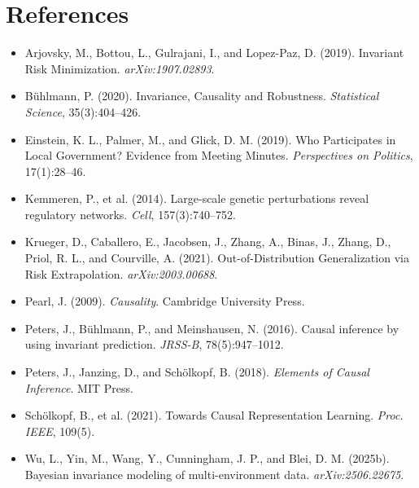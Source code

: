 \documentclass[11pt]{article}
\begin{document}
\section*{References}
\scriptsize
\setlength{\parskip}{0pt}
\begin{itemize}
    \setlength\itemsep{0em}
    \item Arjovsky, M., Bottou, L., Gulrajani, I., and Lopez-Paz, D. (2019). Invariant Risk Minimization. \textit{arXiv:1907.02893}.
    \item Bühlmann, P. (2020). Invariance, Causality and Robustness. \textit{Statistical Science}, 35(3):404--426.
    \item Einstein, K. L., Palmer, M., and Glick, D. M. (2019). Who Participates in Local Government? Evidence from Meeting Minutes. \textit{Perspectives on Politics}, 17(1):28--46.
    \item Kemmeren, P., et al. (2014). Large-scale genetic perturbations reveal regulatory networks. \textit{Cell}, 157(3):740--752.
    \item Krueger, D., Caballero, E., Jacobsen, J., Zhang, A., Binas, J., Zhang, D., Priol, R. L., and Courville, A. (2021). Out-of-Distribution Generalization via Risk Extrapolation. \textit{arXiv:2003.00688}.
    \item Pearl, J. (2009). \textit{Causality}. Cambridge University Press.
    \item Peters, J., Bühlmann, P., and Meinshausen, N. (2016). Causal inference by using invariant prediction. \textit{JRSS-B}, 78(5):947--1012.
    \item Peters, J., Janzing, D., and Schölkopf, B. (2018). \textit{Elements of Causal Inference}. MIT Press.
    \item Schölkopf, B., et al. (2021). Towards Causal Representation Learning. \textit{Proc. IEEE}, 109(5).
    \item Wu, L., Yin, M., Wang, Y., Cunningham, J. P., and Blei, D. M. (2025b). Bayesian invariance modeling of multi-environment data. \textit{arXiv:2506.22675}.
\end{itemize}
\end{document}
